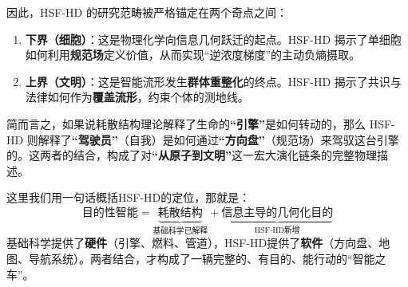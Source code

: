 因此，HSF-HD 的研究范畴被严格锚定在两个奇点之间：
\begin{enumerate}
    \item \textbf{下界（细胞）}：这是物理化学向信息几何跃迁的起点。HSF-HD 揭示了单细胞如何利用\textbf{规范场}定义价值，从而实现“逆浓度梯度”的主动负熵摄取。
    \item \textbf{上界（文明）}：这是智能流形发生\textbf{群体重整化}的终点。HSF-HD 揭示了共识与法律如何作为\textbf{覆盖流形}，约束个体的测地线。
\end{enumerate}

简而言之，如果说耗散结构理论解释了生命的\textbf{“引擎”}是如何转动的，那么 HSF-HD 则解释了\textbf{“驾驶员”}（自我）是如何通过\textbf{“方向盘”}（规范场）来驾驭这台引擎的。这两者的结合，构成了对\textbf{“从原子到文明”}这一宏大演化链条的完整物理描述。

这里我们用一句话概括HSF-HD的定位，那就是：
$$ \text{目的性智能} = \underbrace{\text{耗散结构}}_{\text{基础科学已解释}} + \underbrace{\text{信息主导的几何化目的}}_{\text{HSF-HD新增}} $$
基础科学提供了\textbf{硬件}（引擎、燃料、管道），HSF-HD提供了\textbf{软件}（方向盘、地图、导航系统）。两者结合，才构成了一辆完整的、有目的、能行动的“智能之车”。



